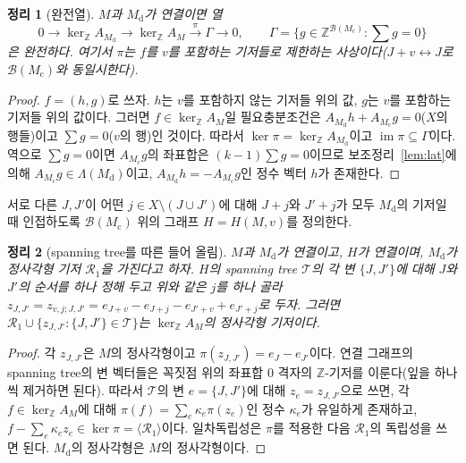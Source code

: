 \documentclass[11pt,a4paper]{article}
\theoremstyle{plain}
\newtheorem{theorem}{정리}[section]
\theoremstyle{definition}
\newcommand{\Z}{\mathbb Z}
\newcommand{\kerZ}{\ker_{\Z}\!A_M}
\newcommand{\bs}{\mathcal B}
\begin{document}
\begin{theorem}[완전열]\label{thm:exact}
$M$과 $M_{\mathrm d}$가 연결이면 열
\[
0\to\ker_\Z A_{M_{\mathrm d}}\to\kerZ\xrightarrow{\ \pi\ }\Gamma\to0,\qquad \Gamma=\Big\{g\in\Z^{\bs(M_{\mathrm c})}:\textstyle\sum g=0\Big\}
\]
은 완전하다. 여기서 $\pi$는 $f$를 $v$를 포함하는 기저들로 제한하는 사상이다($J+v\leftrightarrow J$로 $\bs(M_{\mathrm c})$와 동일시한다).
\end{theorem}
\begin{proof}
$f=(h,g)$로 쓰자. $h$는 $v$를 포함하지 않는 기저들 위의 값, $g$는 $v$를 포함하는 기저들 위의 값이다. 그러면 $f\in\kerZ$일 필요충분조건은 $A_{M_{\mathrm d}}h+A_{M_{\mathrm c}}g=0$($X$의 행들)이고 $\sum g=0$($v$의 행)인 것이다. 따라서 $\ker\pi=\ker_\Z A_{M_{\mathrm d}}$이고 $\operatorname{im}\pi\subseteq\Gamma$이다. 역으로 $\sum g=0$이면 $A_{M_{\mathrm c}}g$의 좌표합은 $(k-1)\sum g=0$이므로 보조정리~\ref{lem:lat}에 의해 $A_{M_{\mathrm c}}g\in\Lambda(M_{\mathrm d})$이고, $A_{M_{\mathrm d}}h=-A_{M_{\mathrm c}}g$인 정수 벡터 $h$가 존재한다.
\end{proof}

서로 다른 $J,J'$이 어떤 $j\in X\setminus(J\cup J')$에 대해 $J+j$와 $J'+j$가 모두 $M_{\mathrm d}$의 기저일 때 인접하도록 $\bs(M_{\mathrm c})$ 위의 그래프 $H=H(M,v)$를 정의한다.

\begin{theorem}[spanning tree를 따른 들어 올림]\label{thm:tree}
$M$과 $M_{\mathrm d}$가 연결이고, $H$가 연결이며, $M_{\mathrm d}$가 정사각형 기저 $\mathcal R_1$을 가진다고 하자. $H$의 spanning tree $\mathcal T$의 각 변 $\{J,J'\}$에 대해 $J$와 $J'$의 순서를 하나 정해 두고 위와 같은 $j$를 하나 골라 $z_{J,J'}=z_{v,j;J,J'}=e_{J+v}-e_{J+j}-e_{J'+v}+e_{J'+j}$로 두자. 그러면 $\mathcal R_1\cup\{z_{J,J'}:\{J,J'\}\in\mathcal T\}$는 $\kerZ$의 정사각형 기저이다.
\end{theorem}
\begin{proof}
각 $z_{J,J'}$은 $M$의 정사각형이고 $\pi(z_{J,J'})=e_J-e_{J'}$이다. 연결 그래프의 spanning tree의 변 벡터들은 꼭짓점 위의 좌표합 $0$ 격자의 $\Z$\nobreakdash-기저를 이룬다(잎을 하나씩 제거하면 된다). 따라서 $\mathcal T$의 변 $e=\{J,J'\}$에 대해 $z_e=z_{J,J'}$으로 쓰면, 각 $f\in\kerZ$에 대해 $\pi(f)=\sum_e\kappa_e\pi(z_e)$인 정수 $\kappa_e$가 유일하게 존재하고, $f-\sum_e\kappa_ez_e\in\ker\pi=\langle\mathcal R_1\rangle$이다. 일차독립성은 $\pi$를 적용한 다음 $\mathcal R_1$의 독립성을 쓰면 된다. $M_{\mathrm d}$의 정사각형은 $M$의 정사각형이다.
\end{proof}
\end{document}
